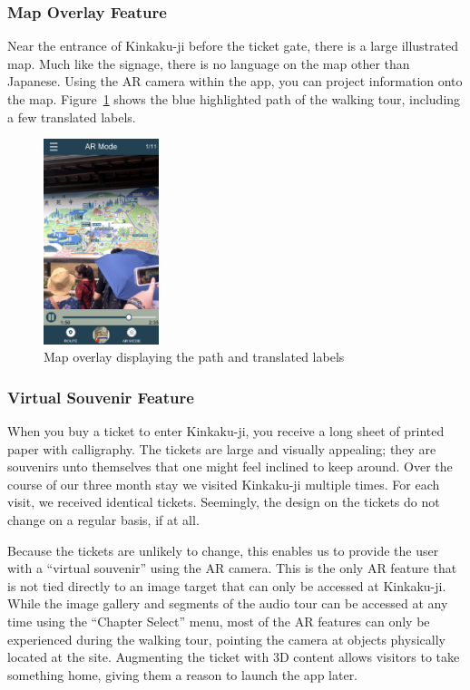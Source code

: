 \documentclass[a4paper, 10pt, american, titlepage]{article}
\begin{document}
\subsubsection{Map Overlay Feature}
\label{sec:mapOverlayFeature}

Near the entrance of Kinkaku-ji before the ticket gate, there is a large
illustrated map. Much like the signage, there is no language on the map other
than Japanese. Using the AR camera within the app, you can project information
onto the map. Figure~\ref{fig:arMapFeature} shows the blue highlighted path of
the walking tour, including a few translated labels. 

\begin{figure}[h] \centering
    \includegraphics[width=0.3\textwidth]{ar-map-feature.png}
    \caption{Map overlay displaying the path and translated labels}
    \label{fig:arMapFeature}
\end{figure}

\subsubsection{Virtual Souvenir Feature}
\label{sec:virtualSouveneir}

When you buy a ticket to enter Kinkaku-ji, you receive a long sheet of
printed paper with calligraphy. The tickets are large and visually appealing;
they are souvenirs unto themselves that one might feel inclined to keep
around. Over the course of our three month stay we visited Kinkaku-ji
multiple times. For each visit, we received identical tickets. Seemingly, the
design on the tickets do not change on a regular basis, if at all.

Because the tickets are unlikely to change, this enables us to provide the
user with a ``virtual souvenir'' using the AR camera. This is the only AR
feature that is not tied directly to an image target that can only be
accessed at Kinkaku-ji. While the image gallery and segments of the audio
tour can be accessed at any time using the ``Chapter Select'' menu, most of
the AR features can only be experienced during the walking tour, pointing the
camera at objects physically located at the site. Augmenting the ticket
with 3D content allows visitors to take something home, giving them a reason
to launch the app later.
\end{document}
